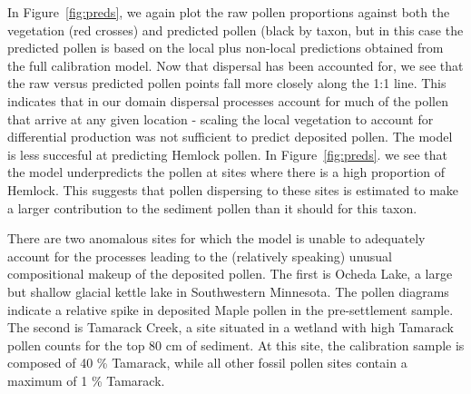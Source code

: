 \documentclass[12pt]{article}
\begin{document}
In Figure~\ref{fig:preds}, we again plot the raw pollen proportions
against both the vegetation (red crosses) and predicted pollen (black by
taxon, but in this case the predicted pollen is based on the local plus
non-local predictions obtained from the full calibration model. Now
that dispersal has been accounted for, we see that the raw versus
predicted pollen points fall more closely along the 1:1 line. This
indicates that in our domain dispersal processes account for much of
the pollen that arrive at any given location - scaling the local vegetation to account for
differential production was not sufficient to predict deposited
pollen. The model is less succesful at predicting Hemlock pollen. In
Figure~\ref{fig:preds}. we see that the model underpredicts the pollen
at sites where there is a high proportion of Hemlock. This suggests
that pollen dispersing to these sites is estimated to make a larger
contribution to the sediment pollen than it should for this taxon.

There are two anomalous sites for which the model is unable to
adequately account for the processes leading to the (relatively
speaking) unusual compositional makeup of the deposited pollen. The
first is Ocheda Lake, a large but shallow glacial kettle lake in
Southwestern Minnesota. The pollen diagrams indicate a relative spike
in deposited Maple pollen in the pre-settlement sample. The second is
Tamarack Creek, a site situated in a wetland with high Tamarack pollen
counts for the top 80 cm of sediment. At this site, the calibration
sample is composed of 40 \% Tamarack, while all other fossil pollen
sites contain a maximum of 1 \% Tamarack.
\end{document}
